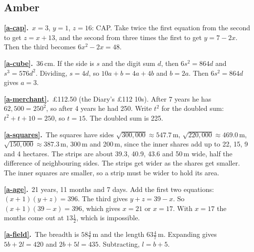 \documentclass[11pt,a4paper]{article}
\newcommand{\ans}[2]{\par\smallskip\noindent\textbf{\ref{#1}.}\ #2}
\begin{document}
\subsection*{\color{bandamber}Amber}
\ans{a-cap}{$x = 3$, $y = 1$, $z = 16$: CAP. Take twice the first equation from the
second to get $z = x + 13$, and the second from three times the first to get
$y = 7 - 2x$. Then the third becomes $6x^2 - 2x = 48$.}
\ans{a-cube}{36\,cm. If the side is $s$ and the digit sum $d$, then $6s^2 = 864d$ and
$s^3 = 576d^2$. Dividing, $s = 4d$, so $10a + b = 4a + 4b$ and $b = 2a$. Then $6s^2 = 864d$
gives $a = 3$.}
\ans{a-merchant}{\pounds112.50 (the Diary's \pounds112 10s). After 7 years he has $62{,}500 = 250^2$,
so after 4 years he had 250. Write $t^2$ for the doubled sum: $t^2 + t + 10 = 250$, so
$t = 15$. The doubled sum is 225.}
\ans{a-squares}{The squares have sides $\sqrt{300{,}000} \approx 547.7$\,m,
$\sqrt{220{,}000} \approx 469.0$\,m, $\sqrt{150{,}000} \approx 387.3$\,m, 300\,m and 200\,m,
since the inner shares add up to 22, 15, 9 and 4 hectares. The strips are about 39.3,
40.9, 43.6 and 50\,m wide, half the difference of neighbouring sides. The strips get
wider as the shares get smaller. The inner squares are smaller, so a strip must be wider
to hold its area.}
\ans{a-age}{21 years, 11 months and 7 days. Add the first two equations:
$(x + 1)(y + z) = 396$. The third gives $y + z = 39 - x$. So $(x + 1)(39 - x) = 396$,
which gives $x = 21$ or $x = 17$. With $x = 17$ the months come out at $13\tfrac12$, which
is impossible.}
\ans{a-field}{The breadth is $58\tfrac47$\,m and the length $63\tfrac47$\,m. Expanding
gives $5b + 2l = 420$ and $2b + 5l = 435$. Subtracting, $l = b + 5$.}
\end{document}
